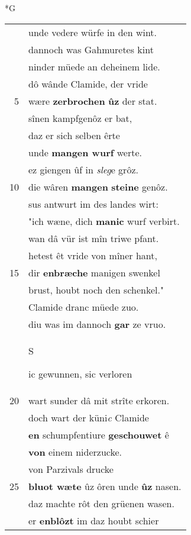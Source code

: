 \documentclass[8pt,a4paper,notitlepage]{article}
\begin{document}
\newpage
\begin{table}[ht]
\begin{minipage}[t]{0.5\linewidth}
\small
\begin{center}*G
\end{center}
\begin{tabular}{rl}
 & unde vedere würfe in den wint.\\ 
 & dannoch was Gahmuretes kint\\ 
 & ninder müede an deheinem lide.\\ 
 & dô wânde Clamide, der vride\\ 
5 & wære \textbf{zerbrochen} \textbf{ûz} der stat.\\ 
 & sînen kampfgenôz er bat,\\ 
 & daz er sich selben êrte\\ 
 & unde \textbf{mangen wurf} werte.\\ 
 & ez giengen ûf in \textit{sleg}e grôz.\\ 
10 & die wâren \textbf{mangen} \textbf{steine} genôz.\\ 
 & sus antwurt im des landes wirt:\\ 
 & "ich wæne, dich \textbf{manic} wurf verbirt.\\ 
 & wan dâ vür ist mîn triwe pfant.\\ 
 & hetest êt vride von mîner hant,\\ 
15 & dir \textbf{enbræche} manigen swenkel\\ 
 & brust, houbt noch den schenkel."\\ 
 & Clamide dranc müede zuo.\\ 
 & diu was im dannoch \textbf{gar} ze vruo.\\ 
 & \begin{large}S\end{large}ic gewunnen, sic verloren\\ 
20 & wart sunder dâ mit strîte erkoren.\\ 
 & doch wart der küni\textit{c} Clamide\\ 
 & \textbf{en} schumpfentiure \textbf{geschouwet} ê\\ 
 & \textbf{von} einem niderzucke.\\ 
 & von Parzivals drucke\\ 
25 & \textbf{bluot wæte} ûz ôren unde \textbf{ûz} nasen.\\ 
 & daz machte rôt den grüenen wasen.\\ 
 & er \textbf{enblôzt} im daz houbt schier\\ 

\end{tabular}
\end{minipage}
\end{table}
\end{document}

